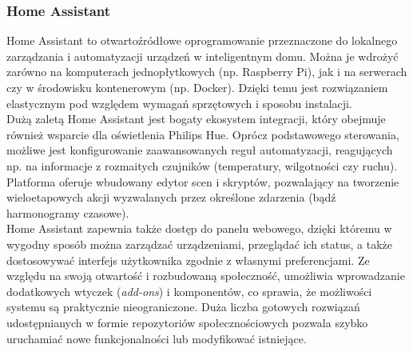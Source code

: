 \documentclass[12pt]{article}
\begin{document}
\subsubsection{Home Assistant}
Home Assistant to otwartoźródłowe oprogramowanie przeznaczone do lokalnego zarządzania i automatyzacji urządzeń w inteligentnym domu.
Można je wdrożyć zarówno na komputerach jednopłytkowych (np. Raspberry Pi), jak i na serwerach czy w środowisku kontenerowym (np. Docker).
Dzięki temu jest rozwiązaniem elastycznym pod względem wymagań sprzętowych i sposobu instalacji.\\
Dużą zaletą Home Assistant jest bogaty ekosystem integracji, który obejmuje również wsparcie
dla oświetlenia Philips Hue. Oprócz podstawowego sterowania, możliwe jest konfigurowanie zaawansowanych reguł automatyzacji,
reagujących np. na informacje z rozmaitych czujników (temperatury, wilgotności czy ruchu).
Platforma oferuje wbudowany edytor scen i skryptów, pozwalający na tworzenie wieloetapowych akcji wyzwalanych przez określone zdarzenia
(bądź harmonogramy czasowe).\\
Home Assistant zapewnia także dostęp do panelu webowego, dzięki któremu w wygodny sposób można zarządzać urządzeniami,
przeglądać ich status, a także dostosowywać interfejs użytkownika zgodnie z własnymi preferencjami.
Ze względu na swoją otwartość i rozbudowaną społeczność, umożliwia wprowadzanie dodatkowych wtyczek (\textit{add-ons})
i komponentów, co sprawia, że możliwości systemu są praktycznie nieograniczone.
Duża liczba gotowych rozwiązań udostępnianych w formie repozytoriów społecznościowych pozwala
szybko uruchamiać nowe funkcjonalności lub modyfikować istniejące. \cite{dokumentacja-home-assistant}
\end{document}
